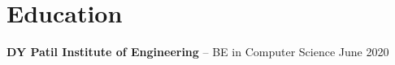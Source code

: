 \documentclass[11pt]{article}       %
\begin{document}
\vspace{-18.5pt}

\section*{Education}
\textbf{DY Patil Institute of Engineering} -- BE in Computer Science \hfill June 2020 \\
\end{document}
